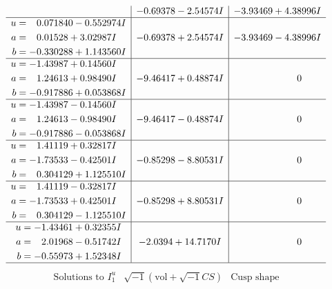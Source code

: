 \documentclass[1p]{elsarticle_modified}
\theoremstyle{definition}
\newcommand{\I}{\sqrt{-1}}
\begin{document}
$$\begin{array}{c|c|c}
 & -0.69378 - 2.54574 I & -3.93469 + 4.38996 I \\ \hline\begin{aligned}
u &= \phantom{-}0.071840 - 0.552974 I \\
a &= \phantom{-}0.01528 + 3.02987 I \\
b &= -0.330288 + 1.143560 I\end{aligned}
 & -0.69378 + 2.54574 I & -3.93469 - 4.38996 I \\ \hline\begin{aligned}
u &= -1.43987 + 0.14560 I \\
a &= \phantom{-}1.24613 + 0.98490 I \\
b &= -0.917886 + 0.053868 I\end{aligned}
 & -9.46417 + 0.48874 I & \phantom{-0.000000 } 0 \\ \hline\begin{aligned}
u &= -1.43987 - 0.14560 I \\
a &= \phantom{-}1.24613 - 0.98490 I \\
b &= -0.917886 - 0.053868 I\end{aligned}
 & -9.46417 - 0.48874 I & \phantom{-0.000000 } 0 \\ \hline\begin{aligned}
u &= \phantom{-}1.41119 + 0.32817 I \\
a &= -1.73533 - 0.42501 I \\
b &= \phantom{-}0.304129 + 1.125510 I\end{aligned}
 & -0.85298 - 8.80531 I & \phantom{-0.000000 } 0 \\ \hline\begin{aligned}
u &= \phantom{-}1.41119 - 0.32817 I \\
a &= -1.73533 + 0.42501 I \\
b &= \phantom{-}0.304129 - 1.125510 I\end{aligned}
 & -0.85298 + 8.80531 I & \phantom{-0.000000 } 0 \\ \hline\begin{aligned}
u &= -1.43461 + 0.32355 I \\
a &= \phantom{-}2.01968 - 0.51742 I \\
b &= -0.55973 + 1.52348 I\end{aligned}
 & -2.0394 + 14.7170 I & \phantom{-0.000000 } 0\\
 \hline 
 \end{array}$$\newpage$$\begin{array}{c|c|c}  
\text{Solutions to }I^u_{1}& \I (\text{vol} + \sqrt{-1}CS) & \text{Cusp shape}\\

\end{array}$$
\end{document}
